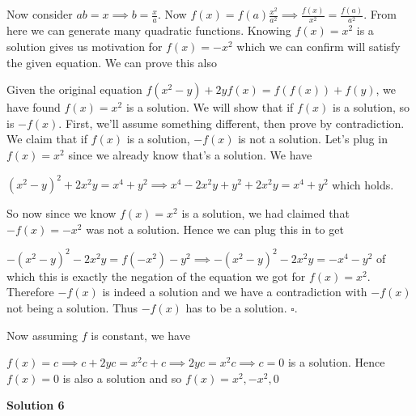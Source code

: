 \begin{enumerate}
 Now consider $ab = x \implies b = \frac{x}{a}$. Now $f(x) = f(a) \frac{x^2}{a^2} \implies \frac{f(x)}{x^2} = \frac{f(a)}{a^2}$. From here we can generate many quadratic functions. Knowing $f(x) = x^2$ is a solution gives us motivation for $f(x) = -x^2$ which we can confirm will satisfy the given equation. We can prove this also

 Given the original equation $f(x^2 - y) + 2yf(x) = f(f(x)) + f(y)$, we have found $f(x) = x^2$ is a solution. We will show that if $f(x)$ is a solution, so is $-f(x)$. First, we'll assume something different, then prove by contradiction. We claim that if $f(x)$ is a solution, $-f(x)$ is not a solution. Let's plug in $f(x) = x^2$ since we already know that's a solution. We have

 $(x^2 - y)^2 + 2x^2 y = x^4 + y^2 \implies x^4 - 2x^2 y + y^2 + 2x^2 y = x^4 + y^2$ which holds. 

 So now since we know $f(x) = x^2$ is a solution, we had claimed that $-f(x) = -x^2$ was not a solution. Hence we can plug this in to get

 $-(x^2 - y)^2 - 2x^2 y = f(-x^2) - y^2 \implies -(x^2 - y)^2 - 2x^2 y = -x^4 - y^2$ of which this is exactly the negation of the equation we got for $f(x) = x^2$. Therefore $-f(x)$ is indeed a solution and we have a contradiction with $-f(x)$ not being a solution. Thus $-f(x)$ has to be a solution. $\square$.

 Now assuming $f$ is constant, we have

 $f(x) = c \implies c + 2yc = x^2 c + c \implies 2yc = x^2 c \implies c = 0$ is a solution. Hence $f(x) = 0$ is also a solution and so $f(x) = x^2, -x^2, 0$




\textbf{Solution 6}


\end{enumerate}
